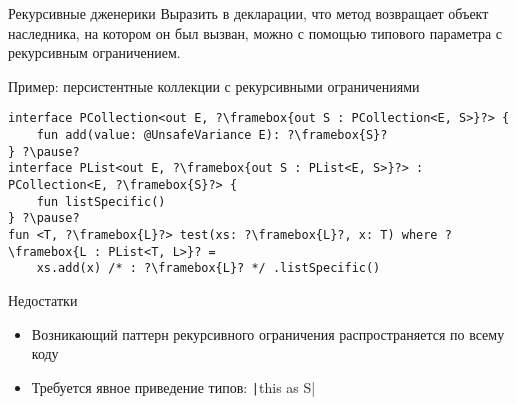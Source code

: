 \documentclass[handout,aspectratio=169,usenames,dvipsnames]{beamer}
\begin{document}
    \begin{frame}[fragile]{Рекурсивные дженерики}
        Выразить в декларации, что метод возвращает объект наследника, на котором он был вызван, можно с помощью типового параметра с рекурсивным ограничением.
        \pause
        \begin{block}{Пример: персистентные коллекции с рекурсивными ограничениями}
            \begin{verbatim}
interface PCollection<out E, ?\framebox{out S : PCollection<E, S>}?> {
    fun add(value: @UnsafeVariance E): ?\framebox{S}?
} ?\pause?
interface PList<out E, ?\framebox{out S : PList<E, S>}?> : PCollection<E, ?\framebox{S}?> {
    fun listSpecific()
} ?\pause?
fun <T, ?\framebox{L}?> test(xs: ?\framebox{L}?, x: T) where ?\framebox{L : PList<T, L>}? =
    xs.add(x) /* : ?\framebox{L}? */ .listSpecific()
            \end{verbatim}
        \end{block}
        \pause
        \begin{block}{Недостатки}
            \begin{itemize}
                \item Возникающий паттерн рекурсивного ограничения распространяется по всему коду
                \item Требуется явное приведение типов: \texttt|this as S|
            \end{itemize}
        \end{block}
    \end{frame}
\end{document}
